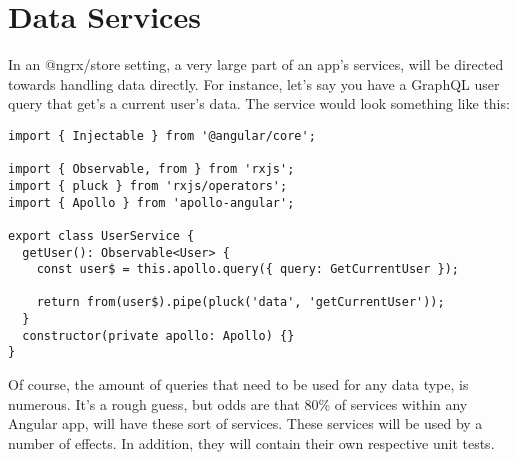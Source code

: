 \maketitle{}
\section{ Data Services }

In an @ngrx/store setting, a very large part of an app's services, will be
directed towards handling data directly. For instance, let's say you have a
GraphQL user query that get's a current user's data. The service would look
something like this:
\begin{lstlisting}
import { Injectable } from '@angular/core';

import { Observable, from } from 'rxjs';
import { pluck } from 'rxjs/operators';
import { Apollo } from 'apollo-angular';

export class UserService {
  getUser(): Observable<User> {
    const user$ = this.apollo.query({ query: GetCurrentUser });

    return from(user$).pipe(pluck('data', 'getCurrentUser'));
  }
  constructor(private apollo: Apollo) {}
}
\end{lstlisting}

Of course, the amount of queries that need to be used for any data type, is
numerous. It's a rough guess, but odds are that 80\% of services within any
Angular app, will have these sort of services. These services will be used by a
number of effects. In addition, they will contain their own respective unit
tests.
